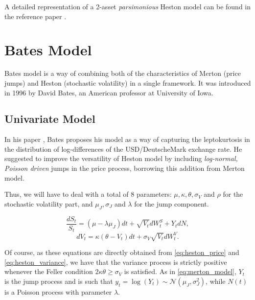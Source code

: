A detailed representation of a 2-asset \textit{parsimonious} Heston model can be found in the reference paper \citep{PARSIMONIOUS2011}.

\bigskip
\section{Bates Model}
\label{sec:bates}
Bates model is a way of combining both of the characteristics of Merton (price jumps) and Heston (stochastic volatility) in a single framework.  It was introduced in 1996 by David Bates, an American professor at University of Iowa.

\subsection{Univariate Model}
In his paper \citep{BATES96}, Bates proposes his model as a way of capturing the leptokurtosis in the distribution of log-differences of the USD/DeutscheMark exchange rate. He suggested to improve the versatility of Heston model by including \textit{log-normal, Poisson driven} jumps in the price process, borrowing this addition from Merton model.

Thus, we will have to deal with a total of 8 parameters: $\mu, \kappa, \theta, \sigma_V$ and $ \rho$ for the stochastic volatility part, and $ \mu_J, \sigma_J$ and $ \lambda$ for the jump component. 


\begin{equation}
\frac{dS_t}{S_t} = (\mu - \lambda \mu_J) dt +\sqrt{ V_t} dW_t^S + Y_t dN ,
\end{equation}
\begin{equation}
dV_t = \kappa (\theta - V_t) dt + \sigma_V \sqrt{V_t} dW_t^V .
\end{equation}

Of course, as these equations are directly obtained from \eqref{eq:heston_price} and \eqref{eq:heston_variance}, we have that the variance process is strictly positive whenever the Feller condition $2\kappa\theta\geq \sigma_V$ is satisfied. As in \eqref{eq:merton_model}, $Y_t$ is  the jump process and is such that $ y_t = \log(Y_t) \sim \mathcal{N}(\mu_J, \sigma_J^2)$, while $N(t)$ is a Poisson process with parameter $\lambda$.


